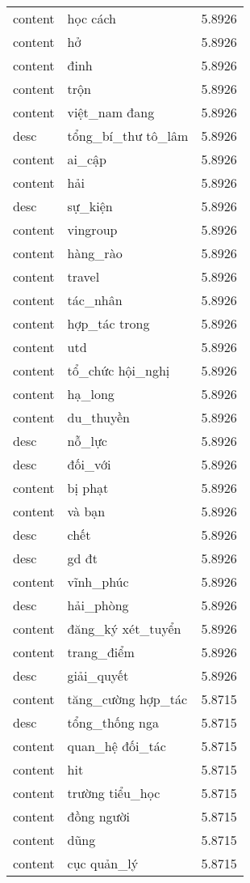 \documentclass{article}
\begin{document}
\begin{tabular}{lll}
content & học cách & 5.8926\\
content & hở & 5.8926\\
content & đinh & 5.8926\\
content & trộn & 5.8926\\
content & việt\_nam đang & 5.8926\\
desc & tổng\_bí\_thư tô\_lâm & 5.8926\\
content & ai\_cập & 5.8926\\
content & hải & 5.8926\\
desc & sự\_kiện & 5.8926\\
content & vingroup & 5.8926\\
content & hàng\_rào & 5.8926\\
content & travel & 5.8926\\
content & tác\_nhân & 5.8926\\
content & hợp\_tác trong & 5.8926\\
content & utd & 5.8926\\
content & tổ\_chức hội\_nghị & 5.8926\\
content & hạ\_long & 5.8926\\
content & du\_thuyền & 5.8926\\
desc & nỗ\_lực & 5.8926\\
desc & đối\_với & 5.8926\\
content & bị phạt & 5.8926\\
content & và bạn & 5.8926\\
desc & chết & 5.8926\\
desc & gd đt & 5.8926\\
content & vĩnh\_phúc & 5.8926\\
desc & hải\_phòng & 5.8926\\
content & đăng\_ký xét\_tuyển & 5.8926\\
content & trang\_điểm & 5.8926\\
desc & giải\_quyết & 5.8926\\
content & tăng\_cường hợp\_tác & 5.8715\\
desc & tổng\_thống nga & 5.8715\\
content & quan\_hệ đối\_tác & 5.8715\\
content & hit & 5.8715\\
content & trường tiểu\_học & 5.8715\\
content & đồng người & 5.8715\\
content & dũng & 5.8715\\
content & cục quản\_lý & 5.8715\\

\end{tabular}
\end{document}
